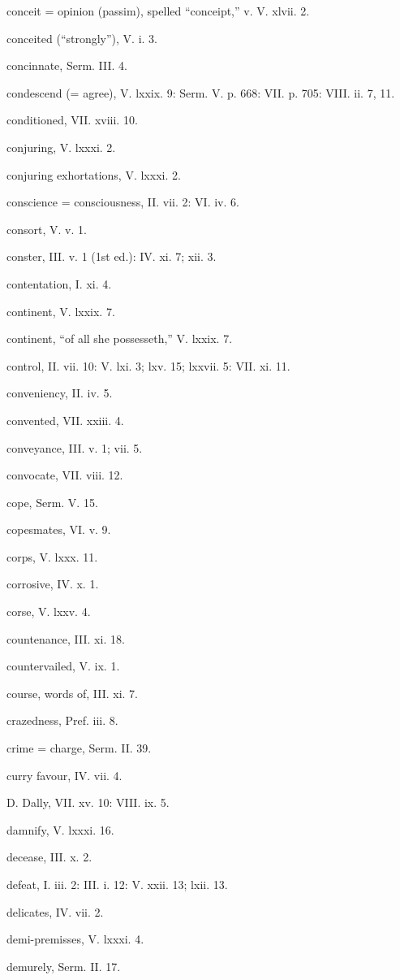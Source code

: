 conceit = opinion (passim), spelled “conceipt,” v. V. xlvii. 2.

conceited (“strongly”), V. i. 3.

concinnate, Serm. III. 4.

condescend (= agree), V. lxxix. 9: Serm. V. p. 668: VII. p. 705: VIII. ii. 7, 11.

conditioned, VII. xviii. 10.

conjuring, V. lxxxi. 2.

conjuring exhortations, V. lxxxi. 2.

conscience = consciousness, II. vii. 2: VI. iv. 6.

consort, V. v. 1.

conster, III. v. 1 (1st ed.): IV. xi. 7; xii. 3.

contentation, I. xi. 4.

continent, V. lxxix. 7.

continent, “of all she possesseth,” V. lxxix. 7.

control, II. vii. 10: V. lxi. 3; lxv. 15; lxxvii. 5: VII. xi. 11.

conveniency, II. iv. 5.

convented, VII. xxiii. 4.

conveyance, III. v. 1; vii. 5.

convocate, VII. viii. 12.

cope, Serm. V. 15.

copesmates, VI. v. 9.

corps, V. lxxx. 11.

corrosive, IV. x. 1.

corse, V. lxxv. 4.

countenance, III. xi. 18.

countervailed, V. ix. 1.

course, words of, III. xi. 7.

crazedness, Pref. iii. 8.

crime = charge, Serm. II. 39.

curry favour, IV. vii. 4.

D.
Dally, VII. xv. 10: VIII. ix. 5.

damnify, V. lxxxi. 16.

decease, III. x. 2.

defeat, I. iii. 2: III. i. 12: V. xxii. 13; lxii. 13.

delicates, IV. vii. 2.

demi-premisses, V. lxxxi. 4.

demurely, Serm. II. 17.

